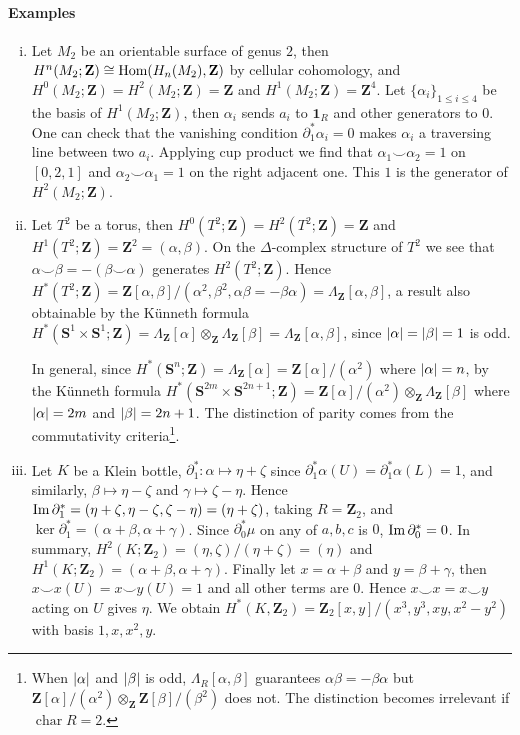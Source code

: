 \documentclass[11pt]{article}
\theoremstyle{definition}
\theoremstyle{plain}
\newcommand{\im}{\textup{Im}\,}
\newcommand{\Z}{\mathbf{Z}}
\newcommand{\Hom}{\textup{Hom}}
\DeclareMathOperator{\Char}{char}
\newcommand{\1}{\mathbf{1}}
\newcommand{\s}{\mathbf{S}}
\begin{document}
\paragraph{Examples}\begin{enumerate}[(i)]
\item Let $M_2$ be an orientable surface of genus $2$, then $H^n(M_2;\Z)\cong\Hom(H_n(M_2),\Z)$ by cellular cohomology, and $H^0(M_2;\Z)=H^2(M_2;\Z)=\Z$ and $H^1(M_2;\Z)=\Z^4$. Let $\{\alpha_i\}_{1\leq i\leq4}$ be the basis of $H^1(M_2;\Z)$, then $\alpha_i$ sends $a_i$ to $\1_R$ and other generators to $0$. One can check that the vanishing condition $\partial^\ast_1\alpha_i=0$ makes $\alpha_i$ a traversing line between two $a_i$. Applying cup product we find that $\alpha_1\smile\alpha_2=1$ on $[0,2,1]$ and $\alpha_2\smile\alpha_1=1$ on the right adjacent one. This $1$ is the generator of $H^2(M_2;\Z)$.

\item Let $T^2$ be a torus, then $H^0(T^2;\Z)=H^2(T^2;\Z)=\Z$ and $H^1(T^2;\Z)=\Z^2=(\alpha,\beta)$. On the $\Delta$-complex structure of $T^2$ we see that $\alpha\smile\beta=-(\beta\smile\alpha)$ generates $H^2(T^2;\Z)$. Hence $H^\ast(T^2;\Z)=\Z[\alpha,\beta]/(\alpha^2,\beta^2,\alpha\beta=-\beta\alpha)=\Lambda_\Z[\alpha,\beta]$, a result also obtainable by the Künneth formula $H^\ast(\s^1\times\s^1;\Z)=\Lambda_\Z[\alpha]\otimes_\Z\Lambda_\Z[\beta]=\Lambda_\Z[\alpha,\beta]$, since $\abs{\alpha}=\abs{\beta}=1$ is odd.\medbreak

In general, since $H^\ast(\s^n;\Z)=\Lambda_\Z[\alpha]=\Z[\alpha]/(\alpha^2)$ where $\abs{\alpha}=n$, by the Künneth formula $H^\ast(\s^{2m}\times\s^{2n+1};\Z)=\Z[\alpha]/(\alpha^2)\otimes_\Z\Lambda_\Z[\beta]$ where $\abs{\alpha}=2m$ and $\abs{\beta}=2n+1$. The distinction of parity comes from the commutativity criteria\footnote{When $\abs{\alpha}$ and $\abs{\beta}$ is odd, $\Lambda_R[\alpha,\beta]$ guarantees $\alpha\beta=-\beta\alpha$ but $\Z[\alpha]/(\alpha^2)\otimes_\Z\Z[\beta]/(\beta^2)$ does not. The distinction becomes irrelevant if $\Char R=2$.}.

\item Let $K$ be a Klein bottle, $\partial_1^\ast:\alpha\mapsto\eta+\zeta$ since $\partial_1^\ast\alpha(U)=\partial_1^\ast\alpha(L)=1$, and similarly, $\beta\mapsto\eta-\zeta$ and $\gamma\mapsto\zeta-\eta$. Hence $\im\partial_1^\ast=(\eta+\zeta,\eta-\zeta,\zeta-\eta)=(\eta+\zeta)$, taking $R=\Z_2$, and $\ker\partial^\ast_1=(\alpha+\beta,\alpha+\gamma)$. Since $\partial_0^\ast\mu$ on any of $a,b,c$ is $0$, $\im\partial^\ast_0=0$. In summary, $H^2(K;\Z_2)=(\eta,\zeta)/(\eta+\zeta)=(\eta)$ and $H^1(K;\Z_2)=(\alpha+\beta,\alpha+\gamma)$. Finally let $x=\alpha+\beta$ and $y=\beta+\gamma$, then $x\smile x(U)=x\smile y(U)=1$ and all other terms are $0$. Hence $x\smile x=x\smile y$ acting on $U$ gives $\eta$. We obtain $H^\ast(K,\Z_2)=\Z_2[x,y]/(x^3,y^3,xy,x^2-y^2)$ with basis $1,x,x^2,y$.


\end{enumerate} 
\end{document}
